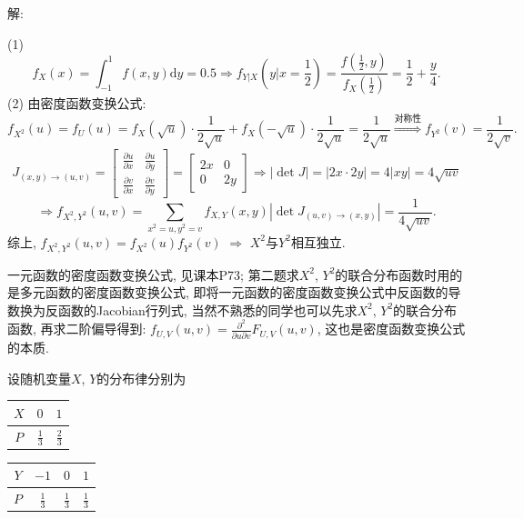 \documentclass[standard]{ExBook}
\begin{document}
\begin{qitems}
\vspace{-5em}

    \begin{bbox}
解: 

(1)
$$f_{X}(x)=\int_{-1}^{1}f(x,y)\mathrm{d}y=0.5 \Longrightarrow f_{Y|X}(y|x=\frac{1}{2})=\frac{f(\frac{1}{2},y)}{f_{X}(\frac{1}{2})}=\frac{1}{2}+\frac{y}{4}.$$
(2) 由密度函数变换公式:
$$f_{X^2}(u)=f_{U}(u)=f_{X}(\sqrt{u})\cdot\frac{1}{2\sqrt{u}}+f_{X}(-\sqrt{u})\cdot\frac{1}{2\sqrt{u}}=\frac{1}{2\sqrt{u}} \overset{\text{对称性}}{\Longrightarrow} f_{Y^2}(v)=\frac{1}{2\sqrt{v}}.$$
\[
J_{(x,y)\to(u,v)} = 
\begin{bmatrix}
\frac{\partial u}{\partial x} & \frac{\partial u}{\partial y} \\
\frac{\partial v}{\partial x} & \frac{\partial v}{\partial y}
\end{bmatrix}
=
\begin{bmatrix}
2x & 0 \\
0 & 2y
\end{bmatrix}
\Longrightarrow |\det J| = |2x \cdot 2y| = 4|xy| = 4\sqrt{uv}
\]
\[
\Longrightarrow
f_{X^2,Y^2}(u,v)=\sum\limits_{x^2=u,y^2=v}f_{X,Y}(x,y)|\det J_{(u,v)\to(x,y)}|=\frac{1}{4\sqrt{uv}}.
\]
综上, $f_{X^2,Y^2}(u,v)=f_{X^2}(u)f_{Y^2}(v)$ $\Longrightarrow$ $X^2$与$Y^2$相互独立.

\textcolor{themeColor}{\selectfont {} 一元函数的密度函数变换公式, 见课本P73; 第二题求$X^2$, $Y^2$的联合分布函数时用的是多元函数的密度函数变换公式, 即将一元函数的密度函数变换公式中反函数的导数换为反函数的Jacobian行列式, 当然不熟悉的同学也可以先求$X^2$, $Y^2$的联合分布函数, 再求二阶偏导得到: $f_{U,V}(u,v)=\frac{\partial^2}{\partial u\partial v}F_{U,V}(u,v)$, 这也是密度函数变换公式的本质.}
    \end{bbox}

\vspace{-5em}

    \begin{bbox}
    \begin{shaded}
        \qitem
设随机变量$X$, $Y$的分布律分别为

\vspace{0.5em}
\renewcommand{\arraystretch}{1.2}
\setlength{\tabcolsep}{2em}
\begin{minipage}[c]{0.4\textwidth}
\centering
\begin{tabular}{c|cc}
    $X$ & $0$ & $1$\\
    \hline
    $P$ & $\displaystyle\frac{1}{3}$ & $\displaystyle\frac{2}{3}$
\end{tabular}
\end{minipage}
\begin{minipage}[c]{0.6\textwidth}
\centering
\begin{tabular}{c|ccc}
    $Y$ & $-1$ & $0$ & $1$\\
    \hline
    $P$ & $\displaystyle\frac{1}{3}$ & $\displaystyle\frac{1}{3}$ & $\displaystyle\frac{1}{3}$
\end{tabular}
\end{minipage}
\vspace{0.2em}


\end{shaded}
\end{bbox}
\end{qitems}
\end{document}
